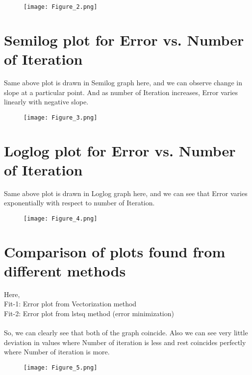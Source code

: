 \documentclass[12pt]{article}
\begin{document}
\begin{figure}[h!]
\centering
\texttt{[image: Figure\_2.png]}
\end{figure}

\newpage
\section*{Semilog plot for Error vs. Number of Iteration}

Same above plot is drawn in Semilog graph here, and we can observe change in slope at a particular point. And as number of Iteration increases, Error varies linearly with negative slope.\\

\begin{figure}[h!]
\centering
\texttt{[image: Figure\_3.png]}
\label{fig:exemplo}
\end{figure}

\newpage
\section*{Loglog plot for Error vs. Number of Iteration}

Same above plot is drawn in Loglog graph here, and we can see that Error varies exponentially with respect to number of Iteration.\\

\begin{figure}[h!]
\centering
\texttt{[image: Figure\_4.png]}
\label{fig:exemplo}
\end{figure}

\newpage
\section*{Comparison of plots found from different methods}

Here,\\ Fit-1: Error plot from Vectorization method \\ Fit-2: Error plot from lstsq method (error minimization)\\\\
So, we can clearly see that both of the graph coincide. Also we can see very little deviation in values where Number of iteration is less and rest coincides perfectly where Number of iteration is more.\\


\begin{figure}[h!]
\centering
\texttt{[image: Figure\_5.png]}
\label{fig:exemplo}
\end{figure}
\end{document}
